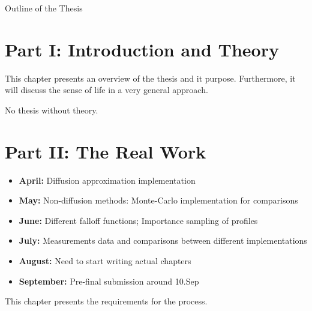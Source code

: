 \newpage

{}

\begin{center}
	\huge{Outline of the Thesis}
\end{center}



\section*{Part I: Introduction and Theory}


\noindent  This chapter presents an overview of the thesis and it purpose. Furthermore, it will discuss the sense of life in a very general approach.


\noindent  No thesis without theory.

\section*{Part II: The Real Work}

\begin{itemize}
    \item{\textbf{April:} Diffusion approximation implementation}
    \item{\textbf{May:} Non-diffusion methods: Monte-Carlo implementation for
    comparisons}
    \item{\textbf{June:} Different falloff functions; Importance sampling of
    profiles}
    \item{\textbf{July:} Measurements data and comparisons between different
    implementations}
    \item{\textbf{August:} Need to start writing actual chapters}
    \item{\textbf{September:} Pre-final submission around 10.Sep}

\end{itemize}


\noindent  This chapter presents the requirements for the process.